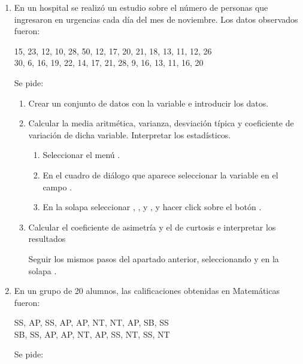 \begin{enumerate}[leftmargin=*]
\item En un hospital se realizó un estudio sobre el número de personas que ingresaron en urgencias cada día del mes de
noviembre. 
Los datos observados fueron:
\begin{center}
15, 23, 12, 10, 28, 50, 12, 17, 20, 21, 18, 13, 11, 12, 26 \\
30, 6, 16, 19, 22, 14, 17, 21, 28, 9, 16, 13, 11, 16, 20
\end{center}
Se pide:

\begin{enumerate}
\item Crear un conjunto de datos con la variable  e introducir los datos.

\item Calcular la media aritmética, varianza, desviación típica y coeficiente de variación de dicha variable.
Interpretar los estadísticos. 
\begin{indicacion}
\begin{enumerate}
\item Seleccionar el menú .
\item En el cuadro de diálogo que aparece seleccionar la variable  en el campo .
\item En la solapa  seleccionar , , 
 y , y hacer click sobre el botón .
\end{enumerate}
\end{indicacion}

\item Calcular el coeficiente de asimetría y el de curtosis e interpretar los resultados
\begin{indicacion}
Seguir los mismos pasos del apartado anterior, seleccionando  y  en la solapa .
\end{indicacion}
\end{enumerate}


\item En un grupo de 20 alumnos, las calificaciones obtenidas en Matemáticas fueron:
\begin{center}
SS, AP, SS, AP, AP, NT, NT, AP, SB, SS \\
SB, SS, AP, AP, NT, AP, SS, NT, SS, NT
\end{center}
Se pide:


\end{enumerate}
